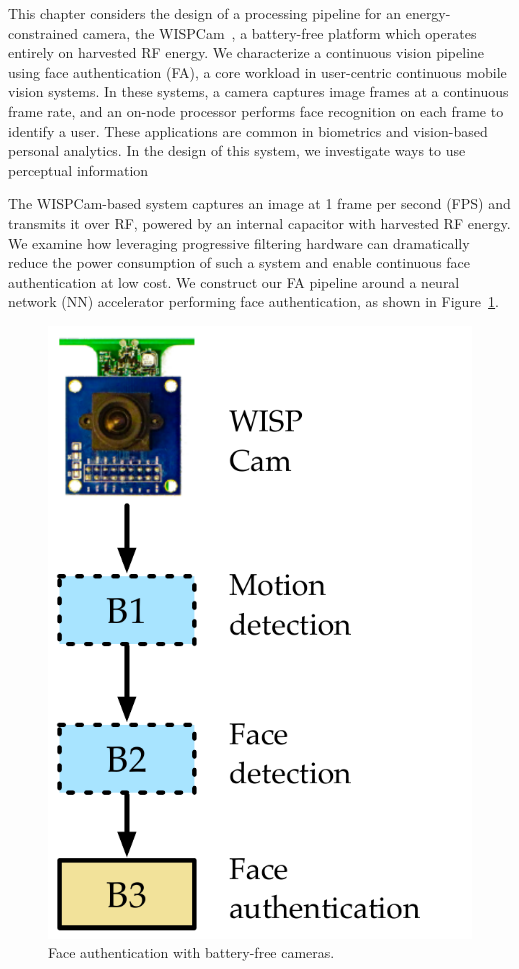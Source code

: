 
\label{sec:nsp-face-auth}

This chapter considers the design of a processing pipeline for an energy-constrained camera, the WISPCam~\cite{wispcam}, a battery-free platform which operates entirely on harvested RF energy.
We characterize a continuous vision pipeline using face authentication (FA), a core workload in user-centric continuous mobile vision systems.
In these systems, a camera captures image frames at a continuous frame rate, and an on-node processor performs face recognition on each frame to identify a user.
These applications are common in biometrics and vision-based personal analytics.
In the design of this system, we investigate ways to use perceptual information


The WISPCam-based system captures an image at 1 frame per second (FPS) and transmits it over RF, powered by an internal capacitor with harvested RF energy.
We examine how leveraging progressive filtering hardware can dramatically reduce the power consumption of such a system and enable continuous face authentication at low cost.
We construct our FA pipeline around a neural network (NN) accelerator performing face authentication, as shown in Figure~\ref{fig:face_recog_pipeline_solution}.


\begin{figure}
  \includegraphics[width=.8\textwidth]{nsp-figs/FA_pipeline_base_with_example.pdf}
  \caption{Face authentication with battery-free cameras. }
  \label{fig:face_recog_pipeline_solution}
\end{figure}

